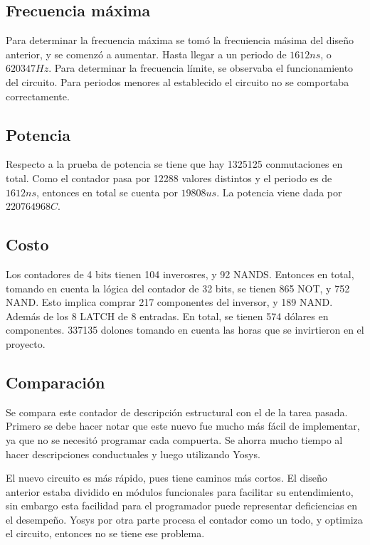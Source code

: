 \documentclass {article}
\begin{document}
\subsection{Frecuencia máxima}

Para determinar la frecuencia máxima se tomó la frecuiencia másima del
diseño anterior, y se comenzó a aumentar. Hasta llegar a un periodo de
$1612ns$, o $620347 Hz$. Para determinar la frecuencia límite, se
observaba el funcionamiento del circuito. Para periodos menores al
establecido el circuito no se comportaba correctamente.

\subsection{Potencia}

Respecto a la prueba de potencia se tiene que hay 1325125 conmutaciones en total. Como
el contador pasa por 12288 valores distintos y el periodo es de $1612ns$, entonces en total
se cuenta por $19808us$. La potencia viene dada por $220764968C$. 

\subsection{Costo}

Los contadores de 4 bits tienen 104 inverosres, y 92 NANDS. Entonces en total, tomando en cuenta la lógica del contador de 32 bits, se tienen 865 NOT, y 752 NAND. Esto implica comprar 217 componentes del inversor, y 189 NAND. Además de los 8 LATCH de 8 entradas. En total, se tienen 574 
dólares en componentes. 337135 dolones tomando en cuenta las horas que se invirtieron en el proyecto. 

\subsection{Comparación}
Se compara este contador de descripción estructural con el de la tarea pasada. Primero se debe hacer notar que este nuevo fue mucho más fácil de implementar, ya que no se necesitó
programar cada compuerta. Se ahorra mucho tiempo al hacer descripciones conductuales y luego utilizando Yosys. 

El nuevo circuito es más rápido, pues tiene caminos más cortos. El diseño anterior estaba dividido en módulos funcionales para facilitar su entendimiento, sin embargo esta facilidad para
el programador puede representar deficiencias en el desempeño. Yosys por otra parte procesa el contador como un todo, y  optimiza el circuito, entonces no se tiene ese problema. 
\end{document}
